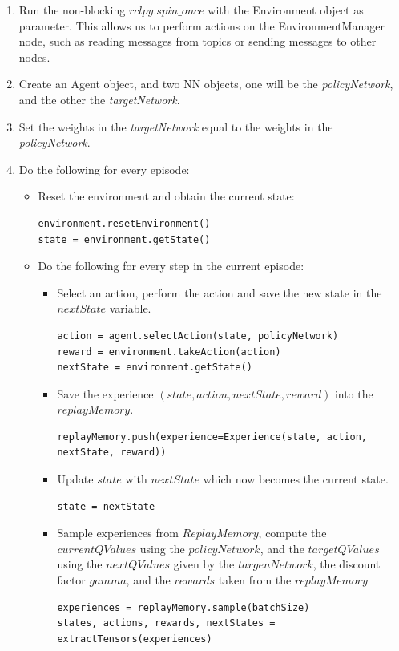 \documentclass[12pt,oneside]{article}
\begin{document}
\begin{enumerate}
\item Run the non-blocking $rclpy.spin\_once$ with the Environment object as parameter. This allows us to perform actions on the EnvironmentManager node, such as reading messages from topics or sending messages to other nodes.
\item Create an Agent object, and two NN objects, one will be the \textit{policyNetwork}, and the other the \textit{targetNetwork}.
\item Set the weights in the \textit{targetNetwork} equal to the weights in the \textit{policyNetwork}.
\item Do the following for every episode:
	\begin{itemize}
		\item Reset the environment and obtain the current state:
\begin{tcolorbox}[]
\begin{verbatim}
environment.resetEnvironment()
state = environment.getState()
\end{verbatim}
\end{tcolorbox}
		\item Do the following for every step in the current episode:
		\begin{itemize}
			\item Select an action, perform the action and save the new state in the $nextState$ variable.
\begin{tcolorbox}[]
\begin{verbatim}
action = agent.selectAction(state, policyNetwork)
reward = environment.takeAction(action)
nextState = environment.getState()
\end{verbatim}
\end{tcolorbox}
			\item Save the experience $(state, action, nextState, reward)$ into the $replayMemory$.
\begin{tcolorbox}[]
\begin{verbatim}
replayMemory.push(experience=Experience(state, action, nextState, reward))
\end{verbatim}
\end{tcolorbox}
			\item Update $state$ with $nextState$ which now becomes the current state.
\begin{tcolorbox}[]
\begin{verbatim}
state = nextState
\end{verbatim}
\end{tcolorbox}
			\item Sample experiences from $ReplayMemory$, compute the $currentQValues$ using the $policyNetwork$, and the $targetQValues$ using the $nextQValues$ given by the $targenNetwork$, the discount factor $gamma$, and the $rewards$ taken from the $replayMemory$
\begin{tcolorbox}[]
\begin{verbatim}
experiences = replayMemory.sample(batchSize)
states, actions, rewards, nextStates = extractTensors(experiences)


\end{verbatim}
\end{tcolorbox}
\end{itemize}
\end{itemize}
\end{enumerate}
\end{document}
